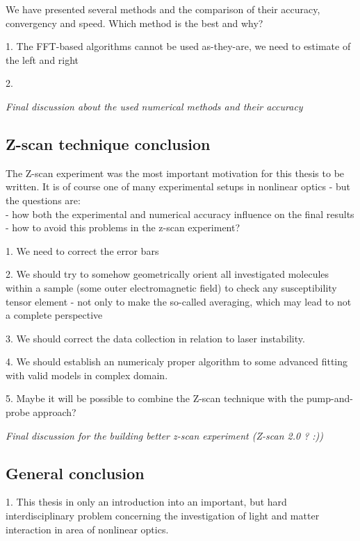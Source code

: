 \documentclass[12pt,twoside,a4paper]{article}
\def\emptyline{\vspace{12pt}}
\numberwithin{equation}{subsection}
\numberwithin{figure}{subsection}
\begin{document}
We have presented several methods and the comparison of their accuracy, convergency and speed. Which method is the best and why?

\emptyline

1. The FFT-based algorithms cannot be used as-they-are, we need to
estimate of the left and right


\emptyline

2. 


\textit{Final discussion about the used numerical methods and their accuracy}

\subsection{Z-scan technique conclusion} \label{chap:conclusion_zscan}

The Z-scan experiment was the most important motivation for this thesis to be written. It is of course one of many experimental
setups in nonlinear optics - but the questions are: \\
- how both the experimental and numerical accuracy influence on the final results \\
- how to avoid this problems in the z-scan experiment? \\
\emptyline

1. We need to correct the error bars

2. We should try to somehow geometrically orient all investigated molecules within a sample (some outer electromagnetic field) to
check any susceptibility tensor element - not only to make the so-called averaging, which may lead to not a complete perspective

3. We should correct the data collection in relation to laser instability.

4. We should establish an numericaly proper algorithm to some advanced fitting with valid models in complex domain.

5. Maybe it will be possible to combine the Z-scan technique with the pump-and-probe approach?

\textit{Final discussion for the building better z-scan experiment (Z-scan 2.0 ? :))}

\subsection{General conclusion} \label{chap:conclusion_general}

1. This thesis in only an introduction into an important, but hard interdisciplinary problem concerning the investigation of light
and matter interaction in area of nonlinear optics. 
\end{document}
